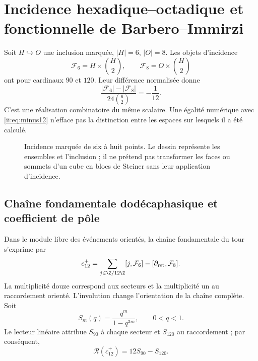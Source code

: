 \section{Incidence hexadique--octadique et fonctionnelle de Barbero--Immirzi}
\label{ii:sec:barbero}
Soit $H\hookrightarrow O$ une inclusion marquée, $|H|=6$, $|O|=8$.
Les objets d'incidence
\[
\mathcal F_6=H\times\binom H2,\qquad
\mathcal F_8=O\times\binom H2
\]
ont pour cardinaux $90$ et $120$. Leur différence normalisée donne
\[
\frac{|\mathcal F_6|-|\mathcal F_8|}{24\binom62}=-\frac1{12}.
\]
C'est une réalisation combinatoire du même scalaire.
Une égalité numérique avec \eqref{ii:eq:minus12} n'efface pas
la distinction entre les espaces sur lesquels il a été calculé.

\begin{figure}[htbp]
\centering
{}
\caption{Incidence marquée de six à huit points. Le dessin représente
les ensembles et l'inclusion ; il ne prétend pas transformer les faces ou sommets
d'un cube en blocs de Steiner sans leur application d'incidence.}
\end{figure}

\subsection{Chaîne fondamentale dodécaphasique et coefficient de pôle}
Dans le module libre des événements orientés, la chaîne fondamentale du tour s’exprime par
\[
c_{12}^{+}=
\sum_{j\in\Z/12\Z}[j,\mathcal F_6]
-[\partial_{\rm ret},\mathcal F_8].
\]
La multiplicité douze correspond aux secteurs et la multiplicité un
au raccordement orienté. L'involution change l'orientation de la chaîne
complète. Soit
\[
S_m(q)=\frac{q^m}{1-q^{3m}},\qquad 0<q<1.
\]
Le lecteur linéaire attribue $S_{90}$ à chaque secteur et $S_{120}$ au raccordement ;
par conséquent,
\[
\mathscr R(c_{12}^{+})=12S_{90}-S_{120}.
\]

